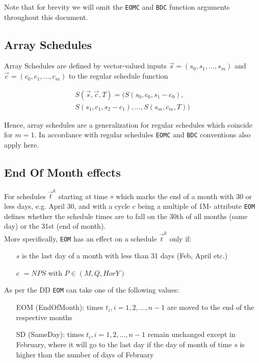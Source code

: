 \documentclass[9pt,oneside]{amsart}
\newcommand{\attr}[1]{\texttt{#1}}
\newcommand{\sdl}[3]{S(#1,#2,#3)}
\begin{document}
\begin{multicols}{2}
Note that for brevity we will omit the \attr{EOMC} and \attr{BDC} function arguments throughout this document.


\subsection{Array Schedules}

Array Schedules are defined by vector-valued inputs $\vec{s}=(s_0,s_1,...,s_m)$ and $\vec{c}=(c_0,c_1,...,c_m)$ to the regular schedule function

\begin{multline*}
	\sdl{\vec{s}}{\vec{c}}{T} = (\sdl{s_0}{c_0}{s_1-c_0},\\
					\sdl{s_1}{c_1}{s_2-c_1},...,\sdl{s_m}{c_m}{T})
\end{multline*}


Hence, array schedules are a generalization for regular schedules which coincide for $m=1$. In accordance with regular schedules \attr{EOMC} and \attr{BDC} conventions also apply here.


\subsection{End Of Month effects}

For schedules $\vec{t}^k$ starting at time $s$ which marks the end of a month with 30 or less days, e.g. April 30, and with a cycle $c$ being a multiple of 1M- attribute \attr{EOM} defines whether the schedule times are to fall on the 30th of all months (same day) or the 31st (end of month).\\ 

More specifically, \attr{EOM} has an effect on a schedule $\vec{t}^k$ only if:

\begin{itemize}
	\item[$s$] is the last day of a month with less than 31 days (Feb, April etc.)

	\item[$c$] $=NPS$ with $P\in(M, Q, H or Y)$
\end{itemize}

As per the DD \attr{EOM} can take one of the following values:
\begin{itemize}
	\item[EOM] (EndOfMonth): times $t_i,i=1,2,...,n-1$ are moved to the end of the respective months

	\item[SD] (SameDay): times $t_i,i=1,2,...,n-1$ remain unchanged except in February, where it will go to the last day if the day of month of time $s$ is higher than the number of days of February
\end{itemize}



\end{multicols}
\end{document}
